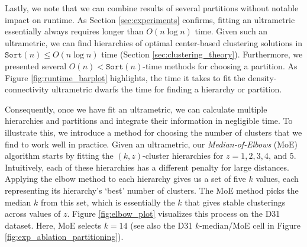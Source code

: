 Lastly, we note that we can combine results of several partitions without notable impact on runtime. As Section \ref{sec:experiments} confirms, fitting an ultrametric essentially always requires longer than $O(n \log n)$ time. Given such an ultrametric, we can find hierarchies of optimal center-based clustering solutions in $\texttt{Sort}(n) \leq O(n \log n)$ time (Section \ref{sec:clustering_theory}). Furthermore, we presented several $O(n) < \texttt{Sort}(n)$-time methods for choosing a partition. As Figure \ref{fig:runtime_barplot} highlights, the time it takes to fit the density-connectivity ultrametric dwarfs the time for finding a hierarchy or partition.
%

%
Consequently, once we have fit an ultrametric, we can calculate multiple hierarchies and partitions and integrate their information in negligible time. To illustrate this, we introduce a method for choosing the number of clusters that we find to work well in practice.
Given an ultrametric, our \emph{Median-of-Elbows} (MoE) algorithm starts by fitting the $(k, z)$-cluster hierarchies for $z = 1, 2, 3, 4\text{, and }5$. Intuitively, each of these hierarchies has a different penalty for large distances. Applying the elbow method to each hierarchy gives us a set of five $k$ values, each representing its hierarchy's `best' number of clusters. 
The MoE method picks the median $k$ from this set, which is essentially the $k$ that gives stable clusterings across values of $z$. Figure \ref{fig:elbow_plot} visualizes this process on the D31 dataset. Here, MoE selects $k=14$ (see also the D31 $k$-median/MoE cell in Figure \ref{fig:exp_ablation_partitioning}).



